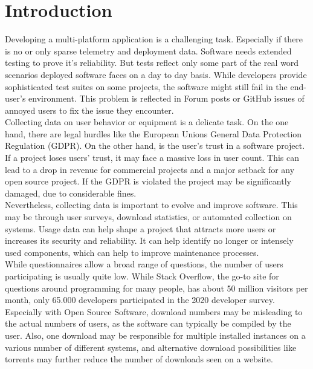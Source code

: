 \chapter{Introduction}
\label{chap:introduction}
%
Developing a multi-platform application is a challenging task. Especially if 
there is no or only sparse telemetry and deployment data. Software needs extended testing to prove it's reliability. But tests reflect only some part of the real word scenarios deployed software faces on a day to day basis. While developers provide sophisticated test suites on some projects, the software might still fail in the end-user's environment. This problem is reflected in Forum posts or GitHub issues of annoyed users to fix the issue they encounter.\\

Collecting data on user behavior or equipment is a delicate task. On the one hand, there are legal hurdles like the European Unions General Data Protection Regulation (GDPR). On the other hand, is the user's trust in a software project. If a project loses users' trust, it may face a massive loss in user count. This can lead to a drop in revenue for commercial projects and a major setback for any open source project. If the GDPR is violated the project may be significantly damaged, due to considerable fines.\\
Nevertheless, collecting data is important to evolve and improve software. This may be through user surveys, download statistics, or automated collection on systems.
Usage data can help shape a project that attracts more users or increases its security and reliability.
It can help identify no longer or intensely used components, which can help to improve maintenance processes.\\
While questionnaires allow a broad range of questions, the number of users participating is usually quite low. While Stack Overflow, the go-to site for questions around programming for many people, has about 50 million visitors per month, only 65.000 developers participated in the 2020 developer survey\cite{noauthor_stack_nodate}.
Especially with Open Source Software, download numbers may be misleading to the actual numbers of users, as the software can typically be compiled by the user. Also, one download may be responsible for multiple installed instances on a various number of different systems, and alternative download possibilities like torrents may further reduce the number of downloads seen on a website.\\

